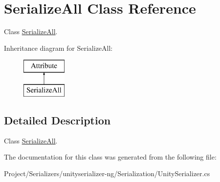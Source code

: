 \hypertarget{class_serialize_all}{}\section{Serialize\+All Class Reference}
\label{class_serialize_all}


Class \hyperlink{class_serialize_all}{Serialize\+All}.  


Inheritance diagram for Serialize\+All\+:\begin{figure}[H]
\begin{center}
\leavevmode
\includegraphics[height=2.000000cm]{class_serialize_all}
\end{center}
\end{figure}


\subsection{Detailed Description}
Class \hyperlink{class_serialize_all}{Serialize\+All}. 



The documentation for this class was generated from the following file\+:\begin{DoxyCompactItemize}
\item 
Project/\+Serializers/unityserializer-\/ng/\+Serialization/Unity\+Serializer.\+cs\end{DoxyCompactItemize}
